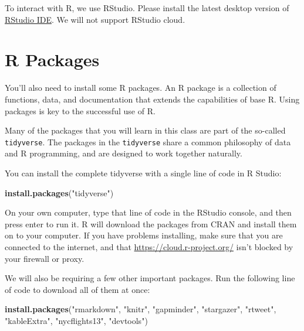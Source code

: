 \documentclass[]{book}
\newenvironment{Shaded}{\begin{snugshade}}{\end{snugshade}}
\newcommand{\KeywordTok}[1]{\textcolor[rgb]{0.13,0.29,0.53}{\textbf{#1}}}
\newcommand{\NormalTok}[1]{#1}
\newcommand{\StringTok}[1]{\textcolor[rgb]{0.31,0.60,0.02}{#1}}
\begin{document}
To interact with R, we use RStudio. Please install the latest desktop version of \href{http://www.rstudio.com/ide/download/desktop}{RStudio IDE}. We will not support RStudio cloud.

\hypertarget{r-packages}{%
\section{R Packages}\label{r-packages}}

You'll also need to install some R packages. An R package is a collection of functions, data, and documentation that extends the capabilities of base R. Using packages is key to the successful use of R.

Many of the packages that you will learn in this class are part of the so-called \texttt{tidyverse}. The packages in the \texttt{tidyverse} share a common philosophy of data and R programming, and are designed to work together naturally.

You can install the complete tidyverse with a single line of code in R Studio:

\begin{Shaded}
\begin{Highlighting}[]
\KeywordTok{install.packages}\NormalTok{(}\StringTok{"tidyverse"}\NormalTok{)}
\end{Highlighting}
\end{Shaded}

On your own computer, type that line of code in the RStudio console, and then press enter to run it. R will download the packages from CRAN and install them on to your computer. If you have problems installing, make sure that you are connected to the internet, and that \url{https://cloud.r-project.org/} isn't blocked by your firewall or proxy.

We will also be requiring a few other important packages. Run the following line of code to download all of them at once:

\begin{Shaded}
\begin{Highlighting}[]
\KeywordTok{install.packages}\NormalTok{(}\StringTok{"rmarkdown"}\NormalTok{, }\StringTok{"knitr"}\NormalTok{, }\StringTok{"gapminder"}\NormalTok{, }
                 \StringTok{"stargazer"}\NormalTok{, }\StringTok{"rtweet"}\NormalTok{, }\StringTok{"kableExtra"}\NormalTok{,}
                 \StringTok{"nycflights13"}\NormalTok{, }\StringTok{"devtools"}\NormalTok{)}
\end{Highlighting}
\end{Shaded}
\end{document}
